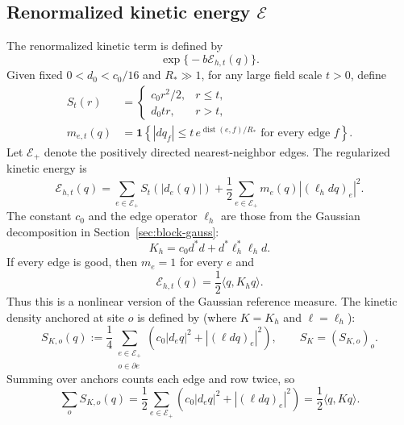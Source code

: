 \documentclass[11pt]{article}
\numberwithin{equation}{section}
\theoremstyle{definition}
\theoremstyle{plain}
\begin{document}
\subsection{Renormalized kinetic energy $\mathcal E$}
\label{subsec:kinetic-energy}

The renormalized kinetic term is defined by
\begin{equation}
\exp\big\{-b\mathcal E_{h,t}(q) \big\}.
\end{equation}
Given fixed $0<d_0<c_0/16$ and $R_* \gg 1$, for any large field scale $t>0$, define
\begin{align}
 S_t(r)&=\begin{cases}
 c_0r^2/2,&r\le t,\\
 d_0tr,&r>t,
 \end{cases}\\
 m_{e,t}(q)&=\mathbf1\!\left\{
 |dq_f|\le t\,e^{\operatorname{dist}(e,f)/R_*}
                       \text{ for every edge }f\right\}.
\end{align}
Let $\mathcal E_+$ denote the positively directed nearest-neighbor edges.
The regularized kinetic energy is
\begin{equation}
 \mathcal E_{h,t}(q)
 =
 \sum_{e\in\mathcal E_+} S_t(|d_e(q)|)+
 \frac12\sum_{e\in\mathcal E_+}m_e(q)|(\ell_hdq)_e|^2.
 \label{eq:energy}
\end{equation}
The constant $c_0$ and the edge operator $\ell_h$ are those from the Gaussian decomposition in Section~\ref{sec:block-gauss}:
\begin{equation}
 K_h=c_0d^*d+d^*\ell_h^*\ell_hd.
\end{equation}
If every edge is good, then $m_e=1$ for every $e$ and
\begin{equation}
 \mathcal E_{h,t}(q)=\frac12\langle q,K_hq\rangle.
\end{equation}
Thus this is a nonlinear version of the Gaussian reference measure.
The kinetic density anchored at site $o$ is defined by (where $K=K_h$ and $\ell=\ell_h$):
\begin{equation}
 S_{K,o}(q)
   :=\frac14\sum_{\substack{e\in\mathcal E_+\\o\in\partial e}}
       \left(c_0|d_eq|^2+|(\ell dq)_e|^2\right),
 \qquad S_K=(S_{K,o})_o.
 \label{eq:kinetic-density-explicit}
\end{equation}
Summing over anchors counts each edge and row twice, so
\begin{equation}
 \sum_o S_{K,o}(q)
   =\frac12\sum_{e\in\mathcal E_+}
        \left(c_0|d_eq|^2+|(\ell dq)_e|^2\right)
   =\frac12\langle q,Kq\rangle.
 \label{eq:kinetic-density-sum}
\end{equation}
\end{document}
